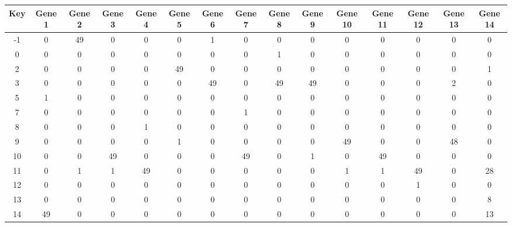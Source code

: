 \begin{tabular}{|c|c|c|c|c|c|c|c|c|c|c|c|c|c|c|}
\hline
Key & Gene 1 & Gene 2 & Gene 3 & Gene 4 & Gene 5 & Gene 6 & Gene 7 & Gene 8 & Gene 9 & Gene 10 & Gene 11 & Gene 12 & Gene 13 & Gene 14 \\
\hline
-1 & 0 & 49 & 0 & 0 & 0 & 1 & 0 & 0 & 0 & 0 & 0 & 0 & 0 & 0 \\
0 & 0 & 0 & 0 & 0 & 0 & 0 & 0 & 1 & 0 & 0 & 0 & 0 & 0 & 0 \\
2 & 0 & 0 & 0 & 0 & 49 & 0 & 0 & 0 & 0 & 0 & 0 & 0 & 0 & 1 \\
3 & 0 & 0 & 0 & 0 & 0 & 49 & 0 & 49 & 49 & 0 & 0 & 0 & 2 & 0 \\
5 & 1 & 0 & 0 & 0 & 0 & 0 & 0 & 0 & 0 & 0 & 0 & 0 & 0 & 0 \\
7 & 0 & 0 & 0 & 0 & 0 & 0 & 1 & 0 & 0 & 0 & 0 & 0 & 0 & 0 \\
8 & 0 & 0 & 0 & 1 & 0 & 0 & 0 & 0 & 0 & 0 & 0 & 0 & 0 & 0 \\
9 & 0 & 0 & 0 & 0 & 1 & 0 & 0 & 0 & 0 & 49 & 0 & 0 & 48 & 0 \\
10 & 0 & 0 & 49 & 0 & 0 & 0 & 49 & 0 & 1 & 0 & 49 & 0 & 0 & 0 \\
11 & 0 & 1 & 1 & 49 & 0 & 0 & 0 & 0 & 0 & 1 & 1 & 49 & 0 & 28 \\
12 & 0 & 0 & 0 & 0 & 0 & 0 & 0 & 0 & 0 & 0 & 0 & 1 & 0 & 0 \\
13 & 0 & 0 & 0 & 0 & 0 & 0 & 0 & 0 & 0 & 0 & 0 & 0 & 0 & 8 \\
14 & 49 & 0 & 0 & 0 & 0 & 0 & 0 & 0 & 0 & 0 & 0 & 0 & 0 & 13 \\
\hline
\end{tabular}